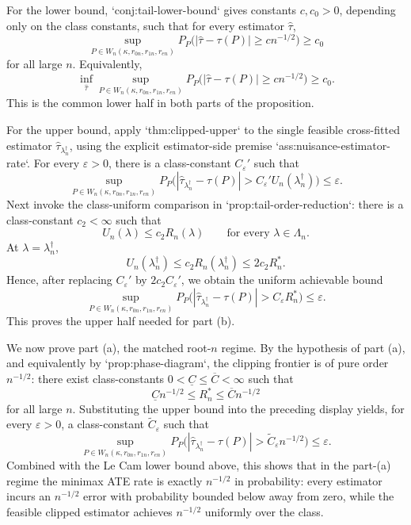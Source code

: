 \documentclass{article}
\begin{document}
For the lower bound, `conj:tail-lower-bound` gives constants \(c,c_0>0\), depending only on the class constants, such that for every estimator \(\hat\tau\),
\[
\sup_{P\in W_n(\kappa,r_{0n},r_{1n},r_{en})}
P_P\bigl(|\hat\tau-\tau(P)|\ge c n^{-1/2}\bigr)\ge c_0
\]
for all large \(n\). Equivalently,
\[
\inf_{\hat\tau}\sup_{P\in W_n(\kappa,r_{0n},r_{1n},r_{en})}
P_P\bigl(|\hat\tau-\tau(P)|\ge c n^{-1/2}\bigr)\ge c_0.
\]
This is the common lower half in both parts of the proposition.

For the upper bound, apply `thm:clipped-upper` to the single feasible cross-fitted estimator \(\hat\tau_{\lambda_n^\dagger}\), using the explicit estimator-side premise `ass:nuisance-estimator-rate`. For every \(\varepsilon>0\), there is a class-constant \(C_\varepsilon'\) such that
\[
\sup_{P\in W_n(\kappa,r_{0n},r_{1n},r_{en})}
P_P\bigl(|\hat\tau_{\lambda_n^\dagger}-\tau(P)|>C_\varepsilon' U_n(\lambda_n^\dagger)\bigr)
\le \varepsilon.
\]
Next invoke the class-uniform comparison in `prop:tail-order-reduction`: there is a class-constant \(c_2<\infty\) such that
\[
U_n(\lambda)\le c_2 R_n(\lambda)
\qquad\text{for every }\lambda\in\Lambda_n.
\]
At \(\lambda=\lambda_n^\dagger\),
\[
U_n(\lambda_n^\dagger)
\le c_2 R_n(\lambda_n^\dagger)
\le 2c_2 R_n^*.
\]
Hence, after replacing \(C_\varepsilon'\) by \(2c_2C_\varepsilon'\), we obtain the uniform achievable bound
\[
\sup_{P\in W_n(\kappa,r_{0n},r_{1n},r_{en})}
P_P\bigl(|\hat\tau_{\lambda_n^\dagger}-\tau(P)|>C_\varepsilon R_n^*\bigr)
\le \varepsilon.
\]
This proves the upper half needed for part (b).

We now prove part (a), the matched root-\(n\) regime. By the hypothesis of part (a), and equivalently by `prop:phase-diagram`, the clipping frontier is of pure order \(n^{-1/2}\): there exist class-constants \(0<\underline C\le \overline C<\infty\) such that
\[
\underline C n^{-1/2}\le R_n^*\le \overline C n^{-1/2}
\]
for all large \(n\). Substituting the upper bound into the preceding display yields, for every \(\varepsilon>0\), a class-constant \(\widetilde C_\varepsilon\) such that
\[
\sup_{P\in W_n(\kappa,r_{0n},r_{1n},r_{en})}
P_P\bigl(|\hat\tau_{\lambda_n^\dagger}-\tau(P)|>\widetilde C_\varepsilon n^{-1/2}\bigr)
\le \varepsilon.
\]
Combined with the Le Cam lower bound above, this shows that in the part-(a) regime the minimax ATE rate is exactly \(n^{-1/2}\) in probability: every estimator incurs an \(n^{-1/2}\) error with probability bounded below away from zero, while the feasible clipped estimator achieves \(n^{-1/2}\) uniformly over the class.
\end{document}
